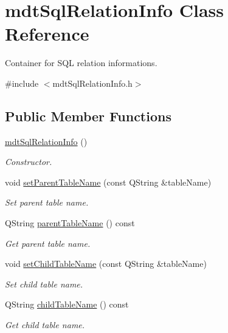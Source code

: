 \hypertarget{classmdt_sql_relation_info}{\section{mdt\-Sql\-Relation\-Info Class Reference}
\label{classmdt_sql_relation_info}
}


Container for S\-Q\-L relation informations.  




{\ttfamily \#include $<$mdt\-Sql\-Relation\-Info.\-h$>$}

\subsection*{Public Member Functions}
\begin{DoxyCompactItemize}
\item 
\hyperlink{classmdt_sql_relation_info_a9c3ae415ee5382a78d28aaf67d625249}{mdt\-Sql\-Relation\-Info} ()
\begin{DoxyCompactList}\small\item\em Constructor. \end{DoxyCompactList}\item 
void \hyperlink{classmdt_sql_relation_info_a604239ad101c1f8f48e9deb10dbc386d}{set\-Parent\-Table\-Name} (const Q\-String \&table\-Name)
\begin{DoxyCompactList}\small\item\em Set parent table name. \end{DoxyCompactList}\item 
Q\-String \hyperlink{classmdt_sql_relation_info_a335960a14e3d165fd190703a87389184}{parent\-Table\-Name} () const 
\begin{DoxyCompactList}\small\item\em Get parent table name. \end{DoxyCompactList}\item 
void \hyperlink{classmdt_sql_relation_info_a41097c0e1ecedfacfb1ac0e4055bc006}{set\-Child\-Table\-Name} (const Q\-String \&table\-Name)
\begin{DoxyCompactList}\small\item\em Set child table name. \end{DoxyCompactList}\item 
Q\-String \hyperlink{classmdt_sql_relation_info_adb76a1ea4923af459c61717853fd6bf6}{child\-Table\-Name} () const 
\begin{DoxyCompactList}\small\item\em Get child table name. \end{DoxyCompactList}\item 

\end{DoxyCompactItemize}
